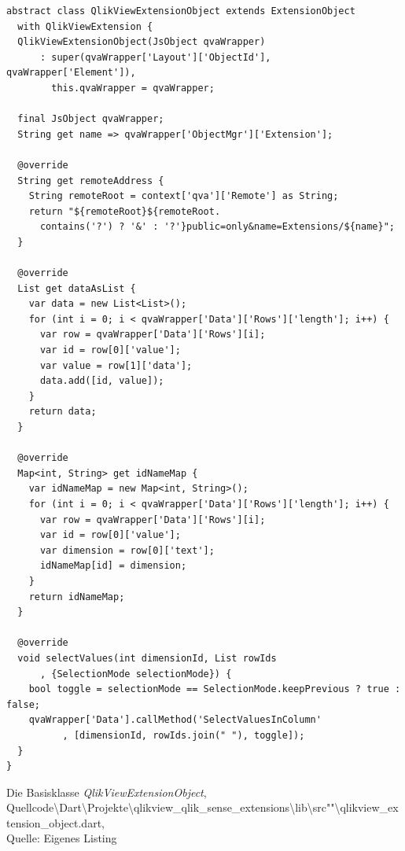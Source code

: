 \ifIncludeFigures\begin{listing}[htbp]
\begin{verbatim}
abstract class QlikViewExtensionObject extends ExtensionObject
  with QlikViewExtension {
  QlikViewExtensionObject(JsObject qvaWrapper)
      : super(qvaWrapper['Layout']['ObjectId'], qvaWrapper['Element']),
        this.qvaWrapper = qvaWrapper;

  final JsObject qvaWrapper;
  String get name => qvaWrapper['ObjectMgr']['Extension'];

  @override
  String get remoteAddress {
    String remoteRoot = context['qva']['Remote'] as String;
    return "${remoteRoot}${remoteRoot.
      contains('?') ? '&' : '?'}public=only&name=Extensions/${name}";
  }

  @override
  List get dataAsList {
    var data = new List<List>();
    for (int i = 0; i < qvaWrapper['Data']['Rows']['length']; i++) {
      var row = qvaWrapper['Data']['Rows'][i];
      var id = row[0]['value'];
      var value = row[1]['data'];
      data.add([id, value]);
    }
    return data;
  }

  @override
  Map<int, String> get idNameMap {
    var idNameMap = new Map<int, String>();
    for (int i = 0; i < qvaWrapper['Data']['Rows']['length']; i++) {
      var row = qvaWrapper['Data']['Rows'][i];
      var id = row[0]['value'];
      var dimension = row[0]['text'];
      idNameMap[id] = dimension;
    }
    return idNameMap;
  }

  @override
  void selectValues(int dimensionId, List rowIds
	  , {SelectionMode selectionMode}) {
    bool toggle = selectionMode == SelectionMode.keepPrevious ? true : false;
    qvaWrapper['Data'].callMethod('SelectValuesInColumn'
		  , [dimensionId, rowIds.join(" "), toggle]);
  }
}
\end{verbatim}
\caption[Die Basisklasse \textit{QlikViewExtensionObject}]{Die Basisklasse \textit{QlikViewExtensionObject}, \\Quellcode\textbackslash{}Dart\textbackslash{}Projekte\textbackslash{}qlikview\_qlik\_sense\_extensions\textbackslash{}lib\textbackslash{}src""\textbackslash{}qlikview\_extension\_object.dart, \\Quelle: Eigenes Listing}
\label{lst:BasisklasseQlikViewExtensionObject}
\end{listing}\fi

